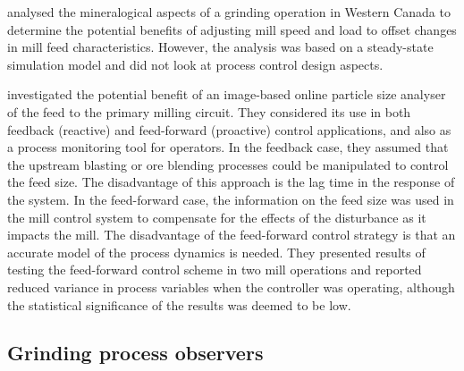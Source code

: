 \cite{liu_development_2018} analysed the mineralogical aspects of a grinding operation in Western Canada to determine the potential benefits of adjusting mill speed and load to offset changes in mill feed characteristics. However, the analysis was based on a steady-state simulation model and did not look at process control design aspects.


%

\cite{steyn_investigating_2018} investigated the potential benefit of an image-based online particle size analyser of the feed to the primary milling circuit. They considered its use in both feedback (reactive) and feed-forward (proactive) control applications, and also as a process monitoring tool for operators. In the feedback case, they assumed that the upstream blasting or ore blending processes could be manipulated to control the feed size. The disadvantage of this approach is the lag time in the response of the system. In the feed-forward case, the information on the feed size was used in the mill control system to compensate for the effects of the disturbance as it impacts the mill. The disadvantage of the feed-forward control strategy is that an accurate model of the process dynamics is needed. They presented results of testing the feed-forward control scheme in two mill operations and reported reduced variance in process variables when the controller was operating, although the statistical significance of the results was deemed to be low.

\subsection{Grinding process observers}

